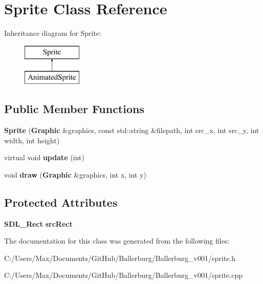 \section{Sprite Class Reference}
\label{class_sprite}
Inheritance diagram for Sprite\+:\begin{figure}[H]
\begin{center}
\leavevmode
\includegraphics[height=2.000000cm]{class_sprite}
\end{center}
\end{figure}
\subsection*{Public Member Functions}
\begin{DoxyCompactItemize}
\item 
{\bfseries Sprite} ({\bf Graphic} \&graphics, const std\+::string \&filepath, int src\+\_\+x, int src\+\_\+y, int width, int height)\label{class_sprite_a47466164808cee0827ed2fa769cc76e6}

\item 
virtual void {\bfseries update} (int)\label{class_sprite_ae93ffca39a384237789ec65de213e68f}

\item 
void {\bfseries draw} ({\bf Graphic} \&graphics, int x, int y)\label{class_sprite_ad1a918703101e1d9e63f82da7504e024}

\end{DoxyCompactItemize}
\subsection*{Protected Attributes}
\begin{DoxyCompactItemize}
\item 
{\bf S\+D\+L\+\_\+\+Rect} {\bfseries src\+Rect}\label{class_sprite_a8fa271c176620b583103408ba6d95810}

\end{DoxyCompactItemize}


The documentation for this class was generated from the following files\+:\begin{DoxyCompactItemize}
\item 
C\+:/\+Users/\+Max/\+Documents/\+Git\+Hub/\+Ballerburg/\+Ballerburg\+\_\+v001/sprite.\+h\item 
C\+:/\+Users/\+Max/\+Documents/\+Git\+Hub/\+Ballerburg/\+Ballerburg\+\_\+v001/sprite.\+cpp\end{DoxyCompactItemize}
